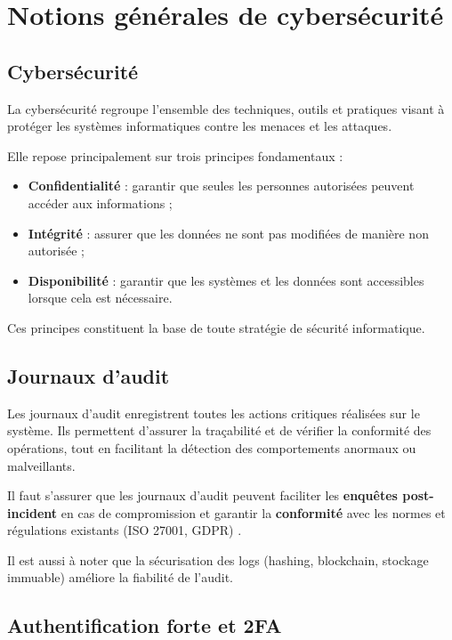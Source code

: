 \documentclass[a4paper,12pt]{report}
\begin{document}
    \section{Notions générales de cybersécurité}
    
    \subsection{Cybersécurité}
    
    La cybersécurité regroupe l’ensemble des techniques, outils et pratiques visant à protéger les systèmes informatiques contre les menaces et les attaques\cite{nist}.
    
    Elle repose principalement sur trois principes fondamentaux :
    
    \begin{itemize}
        \item \textbf{Confidentialité} : garantir que seules les personnes autorisées peuvent accéder aux informations ;
        \item \textbf{Intégrité} : assurer que les données ne sont pas modifiées de manière non autorisée ;
        \item \textbf{Disponibilité} : garantir que les systèmes et les données sont accessibles lorsque cela est nécessaire.
    \end{itemize}
    
    Ces principes constituent la base de toute stratégie de sécurité informatique.
    
    \subsection{Journaux d’audit}
    
    Les journaux d’audit enregistrent toutes les actions critiques réalisées sur le système. Ils permettent d’assurer la traçabilité et de vérifier la conformité des opérations, tout en facilitant la détection des comportements anormaux ou malveillants.
    
    Il faut s'assurer que les journaux d'audit peuvent faciliter les \textbf{enquêtes post-incident} en cas de compromission et garantir la \textbf{conformité} avec les normes et régulations existants (ISO 27001, GDPR) \cite{iso27001}.
    
    Il est aussi à noter que la sécurisation des logs (hashing, blockchain, stockage immuable) améliore la fiabilité de l'audit.
    
    \subsection{Authentification forte et 2FA}
    
\end{document}

